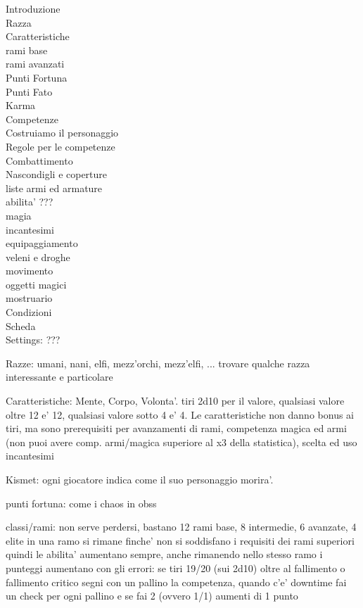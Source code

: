 \documentclass[12pt,a4paper,twoside,openany,twocolumn]{book}
\begin{document}
Introduzione\\
Razza\\
Caratteristiche\\
rami base\\
rami avanzati\\
Punti Fortuna\\
Punti Fato\\
Karma\\
Competenze\\
Costruiamo il personaggio\\
Regole per le competenze\\
Combattimento\\
Nascondigli e coperture\\
liste armi ed armature\\
abilita' ???\\
magia\\
incantesimi\\
equipaggiamento\\
veleni e droghe\\
movimento\\
oggetti magici\\
mostruario\\
Condizioni\\
Scheda\\

Settings: ???

Razze: umani, nani, elfi, mezz'orchi, mezz'elfi, ... trovare qualche razza interessante e particolare

Caratteristiche: Mente, Corpo, Volonta'. tiri 2d10 per il valore, qualsiasi valore oltre 12 e' 12, qualsiasi valore sotto 4 e' 4.
Le caratteristiche non danno bonus ai tiri, ma sono prerequisiti per avanzamenti di rami, competenza magica ed armi (non puoi avere comp. armi/magica superiore al x3 della statistica), scelta ed uso incantesimi

Kismet: ogni giocatore indica come il suo personaggio morira'.

punti fortuna: come i chaos in obss

classi/rami: non serve perdersi, bastano 12 rami base, 8 intermedie, 6 avanzate, 4 elite
in una ramo si rimane finche' non si soddisfano i requisiti dei rami superiori
quindi le abilita' aumentano sempre, anche rimanendo nello stesso ramo
i punteggi aumentano con gli errori: se tiri 19/20 (sui 2d10) oltre al fallimento o fallimento critico segni con un pallino la competenza, quando c'e' downtime fai un check per ogni pallino e se fai 2 (ovvero 1/1) aumenti di 1 punto
\end{document}
